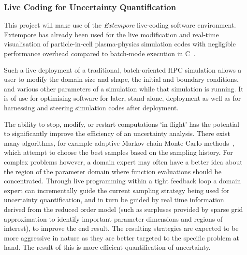 \subsubsection*{Live Coding for Uncertainty
  Quantification}

This project will
make use of the \emph{Extempore} live-coding software
environment.%
 Extempore has already
been used for the live modification and real-time visualisation of
particle-in-cell plasma-physics simulation codes with
negligible performance overhead compared to batch-mode execution in
C~\parencite{swiftLive2016}. 



Such a live deployment of a traditional, batch-oriented HPC simulation allows a user to 
modify the
domain size and shape, the initial and boundary conditions, and various
other parameters of a simulation while that simulation is running. It is of use
for optimising software for later, stand-alone,
deployment as well as for harnessing and steering simulation codes
after deployment.


The ability to stop, modify, or restart computations `in flight' has
the potential to significantly improve the efficiency of an
uncertainty analysis. There exist many algorithms, for example
adaptive Markov chain Monte Carlo methods~\parencite{GilksEtal1994}, 
which attempt to choose the best samples based on the sampling
history. For complex problems however, a domain expert
may often have
a better idea about the region of the parameter domain where function
evaluations should be concentrated. Through live programming within a
tight feedback loop a domain expert can incrementally guide the
current sampling strategy being used for uncertainty 
quantification, and in turn be guided by 
real time information derived from the reduced order model 
(such as surpluses
provided by sparse grid approximation to 
identify important parameter dimensions and regions of interest), 
to improve the end result. The resulting strategies are expected to be
more aggressive in nature as they are better targeted to the specific
problem at hand. The result of this is more efficient quantification of
uncertainty.


